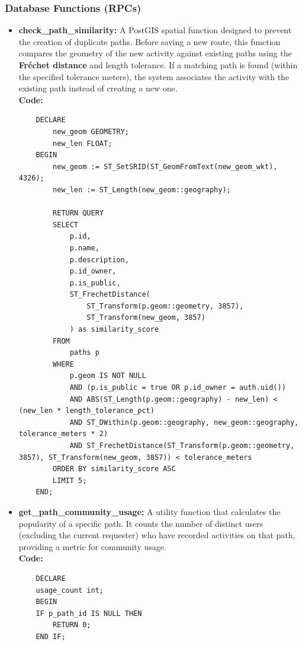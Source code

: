 \subsubsection{Database Functions (RPCs)}
\begin{itemize}
    \item \textbf{check\_path\_similarity:} 
    A PostGIS spatial function designed to prevent the creation of duplicate paths. Before saving a new route, this function compares the geometry of the new activity against existing paths using the \textbf{Fréchet distance} and length tolerance. If a matching path is found (within the specified tolerance meters), the system associates the activity with the existing path instead of creating a new one. \\
    \textbf{Code:}
    \begin{lstlisting}
    DECLARE
        new_geom GEOMETRY;
        new_len FLOAT;
    BEGIN
        new_geom := ST_SetSRID(ST_GeomFromText(new_geom_wkt), 4326);
        new_len := ST_Length(new_geom::geography);

        RETURN QUERY
        SELECT 
            p.id,
            p.name,
            p.description, 
            p.id_owner,    
            p.is_public,
            ST_FrechetDistance(
                ST_Transform(p.geom::geometry, 3857), 
                ST_Transform(new_geom, 3857)
            ) as similarity_score
        FROM 
            paths p
        WHERE 
            p.geom IS NOT NULL
            AND (p.is_public = true OR p.id_owner = auth.uid()) 
            AND ABS(ST_Length(p.geom::geography) - new_len) < (new_len * length_tolerance_pct)
            AND ST_DWithin(p.geom::geography, new_geom::geography, tolerance_meters * 2)
            AND ST_FrechetDistance(ST_Transform(p.geom::geometry, 3857), ST_Transform(new_geom, 3857)) < tolerance_meters
        ORDER BY similarity_score ASC
        LIMIT 5; 
    END;
    \end{lstlisting}

    \item \textbf{get\_path\_community\_usage:} 
    A utility function that calculates the popularity of a specific path. It counts the number of distinct users (excluding the current requester) who have recorded activities on that path, providing a metric for community usage. \\
    \textbf{Code:}
    \begin{lstlisting}
    DECLARE
    usage_count int;
    BEGIN
    IF p_path_id IS NULL THEN
        RETURN 0;
    END IF;


\end{lstlisting}
\end{itemize}
